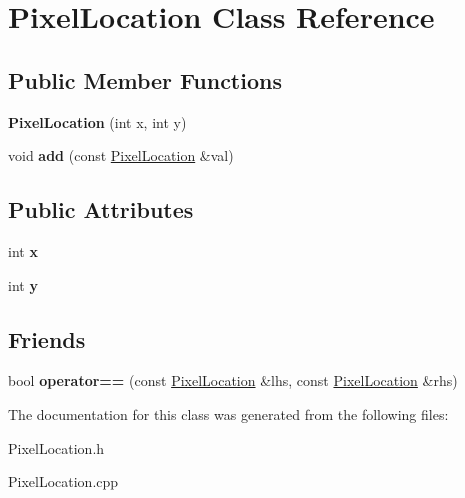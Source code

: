 \hypertarget{class_pixel_location}{}\section{Pixel\+Location Class Reference}
\label{class_pixel_location}
\subsection*{Public Member Functions}
\begin{DoxyCompactItemize}
\item 
\mbox{\label{class_pixel_location_a4229aa113847e419bb8427bfb37a55cf}} 
{\bfseries Pixel\+Location} (int x, int y)
\item 
\mbox{\label{class_pixel_location_aa358ab02675b229e547a5b582d6c2ebf}} 
void {\bfseries add} (const \hyperlink{class_pixel_location}{Pixel\+Location} \&val)
\end{DoxyCompactItemize}
\subsection*{Public Attributes}
\begin{DoxyCompactItemize}
\item 
\mbox{\label{class_pixel_location_ad237ab10b1aa7248dc29b57e45c0de93}} 
int {\bfseries x}
\item 
\mbox{\label{class_pixel_location_a4dbe2d4b3ee1402f0d06e4d7e577fbd4}} 
int {\bfseries y}
\end{DoxyCompactItemize}
\subsection*{Friends}
\begin{DoxyCompactItemize}
\item 
\mbox{\label{class_pixel_location_aa18747fd0126b0c3aae3a5607d6f0558}} 
bool {\bfseries operator==} (const \hyperlink{class_pixel_location}{Pixel\+Location} \&lhs, const \hyperlink{class_pixel_location}{Pixel\+Location} \&rhs)
\end{DoxyCompactItemize}


The documentation for this class was generated from the following files\+:\begin{DoxyCompactItemize}
\item 
Pixel\+Location.\+h\item 
Pixel\+Location.\+cpp\end{DoxyCompactItemize}
